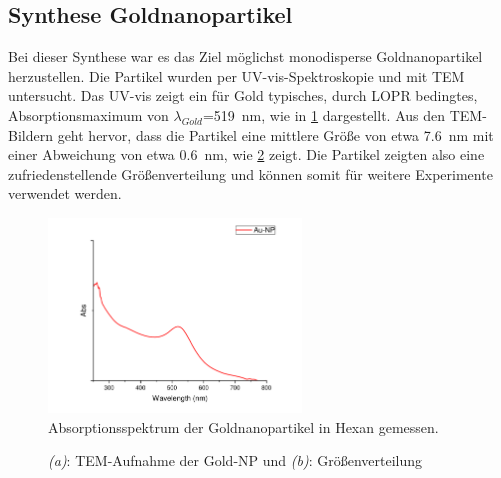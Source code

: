 \subsection{Synthese Goldnanopartikel}
	Bei dieser Synthese war es das Ziel möglichst monodisperse Goldnanopartikel herzustellen.
	Die Partikel wurden per UV-vis-Spektroskopie und mit TEM untersucht.
	Das UV-vis zeigt ein für Gold typisches, durch LOPR bedingtes, Absorptionsmaximum von $\lambda_{Gold}$=\SI{519}{\nano\meter}, wie in \cref{fig:UV-AuNP} dargestellt.
	Aus den TEM-Bildern geht hervor, dass die Partikel eine mittlere Größe von etwa \SI{7,6}{\nano\meter} mit einer Abweichung von etwa \SI{0,6}{\nano\meter}, wie \cref{fig:TEM-Au-Hex-2} zeigt.	
	Die Partikel zeigten also eine zufriedenstellende Größenverteilung und können somit für weitere Experimente verwendet werden.
	
	\begin{figure}[H]
		\centering
		\includegraphics[width=0.6\textwidth]{Bilder/Gold-NP-Organisch} 	
		\caption{Absorptionsspektrum der Goldnanopartikel in Hexan gemessen.}
		\label{fig:UV-AuNP}
	\end{figure}
	
	\begin{figure}[htbp]
		\centering
		\caption{\emph{(a)}: TEM-Aufnahme der Gold-NP und \emph{(b)}: Größenverteilung}
		\label{fig:TEM-Au-Hex-2}
	\end{figure}

